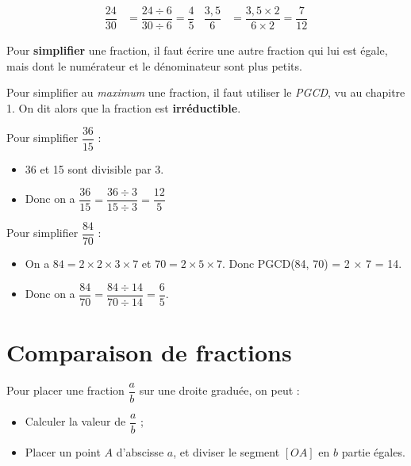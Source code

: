 \documentclass[../€Cours-complet/Cours-complet]{subfiles}
\begin{document}
\begin{exemple}
	\begin{align*}
		\dfrac{24}{30} & = \dfrac{24 ÷ 6}{30 ÷ 6} = \dfrac{4}{5}  &
		\dfrac{3,5}{6} & = \dfrac{3,5 × 2}{6 × 2} = \dfrac{7}{12}
	\end{align*}
\end{exemple}

\begin{cours}
	Pour \textbf{simplifier} une fraction, il faut écrire une autre fraction qui lui est égale, mais dont le numérateur et le dénominateur sont plus petits.

	Pour simplifier au \textit{maximum} une fraction, il faut utiliser le \textit{PGCD}, vu au chapitre 1. On dit alors que la fraction est \textbf{irréductible}.
\end{cours}

\begin{exemple}
	Pour simplifier $\dfrac{36}{15}$ :
	\begin{itemize}
		\item 36 et 15 sont divisible par 3.
		\item Donc on a $\dfrac{36}{15} = \dfrac{36 ÷ 3}{15 ÷ 3} = \dfrac{12}{5}$
	\end{itemize}
\end{exemple}

\begin{exemple}
	Pour simplifier $\dfrac{84}{70}$ :
	\begin{itemize}
		\item On a $84 = 2 × 2 × 3 × 7$ et $70 = 2 × 5 × 7$. Donc PGCD(84, 70) = 2 × 7 = 14.
		\item Donc on a $\dfrac{84}{70} = \dfrac{84 ÷ 14}{70 ÷ 14} = \dfrac{6}{5}$.
	\end{itemize}
\end{exemple}

\section{Comparaison de fractions}

\begin{cours}
	Pour placer une fraction $\dfrac{a}{b}$ sur une droite graduée, on peut :
	\begin{itemize}
		\item Calculer la valeur de $\dfrac{a}{b}$ ;
		\item Placer un point $A$ d'abscisse $a$, et diviser le segment $[OA]$ en $b$ partie égales.
	\end{itemize}
\end{cours}
\end{document}
